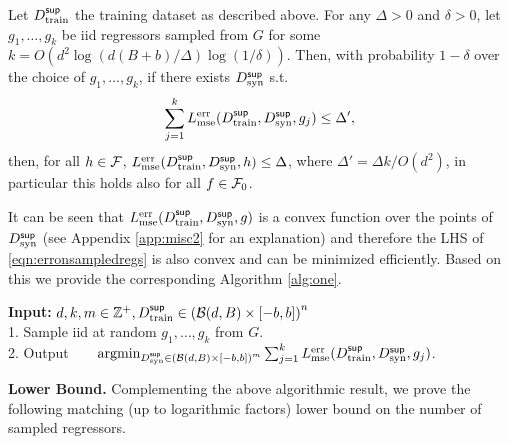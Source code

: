 \begin{theorem}\label{thm:supervised-distill-1}
    Let $D^{\sf sup}_{\textnormal{train}}$ the training dataset as described above. For any $\Delta > 0$ and $\delta > 0$, let $g_1, \dots, g_k$  be iid regressors sampled from  $G$ for some $k = O\left({d^2}\log({d}(B+b)/{\Delta})\log(1/\delta)\right)$. Then, with probability $1-\delta$ over the choice of $g_1, \dots, g_k$, if there exists $D^{\sf sup}_{\textnormal{syn}}$ s.t. 
\begin{equation}
    \sum_{j = 1}^{k} L^{\textnormal{err}}_{\textnormal{mse}}(D^{\sf sup}_{\textnormal{train}}, D^{\sf sup}_{\textnormal{syn}}, g_j) \leq \Delta', \label{eqn:erronsampledregs}
\end{equation}
then, for all $h \in \mathcal{F}$, $L^{\textnormal{err}}_{\textnormal{mse}}(D^{\sf sup}_{\textnormal{train}}, D^{\sf sup}_{\textnormal{syn}}, h) \leq \Delta$, where $\Delta' = \Delta k/O(d^2)$, in particular this holds also for all $f \in \mathcal{F}_0$. 
\end{theorem}
It can be seen that $L^{\textnormal{err}}_{\textnormal{mse}}(D^{\sf sup}_{\textnormal{train}}, D^{\sf sup}_{\textnormal{syn}}, g)$ is a convex function over the points of $D^{\sf sup}_{\textnormal{syn}}$ (see Appendix \ref{app:misc2} for an explanation) and therefore the LHS of \eqref{eqn:erronsampledregs} is also convex and can be minimized efficiently. Based on this we provide the corresponding Algorithm \ref{alg:one}.
\begin{algorithm}

\caption{Supervised Regression Dataset Distillation}\label{alg:one}
{\bf Input:}  $d, k, m \in \mathbb{Z}^+, D^{\sf sup}_{\textnormal{train}} \in \left(\mathcal{B}(d, B) \times [-b, b]\right)^n$\\
1. Sample iid at random $g_1, \dots, g_k$ from $G$.\\
2. Output\ \ \ \  $\textnormal{argmin}_{D^{\sf sup}_{\textnormal{syn}} \in  \left(\mathcal{B}(d, B) \times [-b, b]\right)^m} \sum_{j = 1}^{k} L^{\textnormal{err}}_{\textnormal{mse}}(D^{\sf sup}_{\textnormal{train}}, D^{\sf sup}_{\textnormal{syn}}, g_j)$.
\end{algorithm}

{\bf Lower Bound.} Complementing the above algorithmic result, we prove the following matching (up to logarithmic factors) lower bound on the number of sampled regressors.

